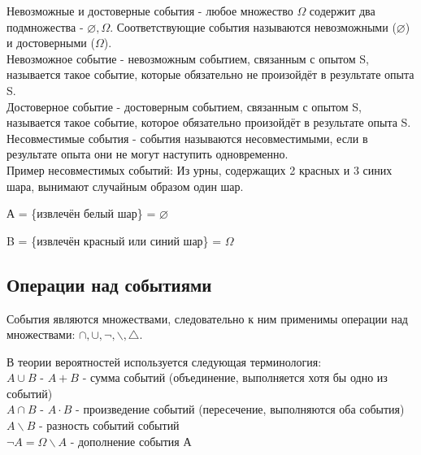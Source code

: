 Невозможные и достоверные события - любое множество $\Omega$ содержит два подмножества - $\varnothing, \Omega$. Соответствующие события называются невозможными ($\varnothing$) и достоверными ($\Omega$).\\

Невозможное событие - невозможным событием, связанным с опытом S, называется такое событие, которые обязательно не произойдёт в результате опыта S.\\

Достоверное событие - достоверным событием, связанным с опытом S, называется такое событие, которое обязательно произойдёт в результате опыта S.\\

Несовместимые события - события называются несовместимыми, если в результате опыта они не могут наступить одновременно.\\

Пример несовместимых событий:
Из урны, содержащих 2 красных и 3 синих шара, вынимают случайным образом один шар.

А = \{извлечён белый шар\} = $\varnothing$

B = \{извлечён красный или синий шар\} = $\Omega$

\subsection{Операции над событиями}
События являются множествами, следовательно к ним применимы операции над множествами: $\cap, \cup, \neg, \backslash, \triangle$.

В теории вероятностей используется следующая терминология:\\
$A \cup B$ - $A + B$ - сумма событий (объединение, выполняется хотя бы одно из событий)\\
$A \cap B$ - $A \cdot B$ - произведение событий (пересечение, выполняются оба события)\\
$A \backslash B$ - разность событий событий\\
$\neg A = \Omega \backslash A$ - дополнение события А \\

